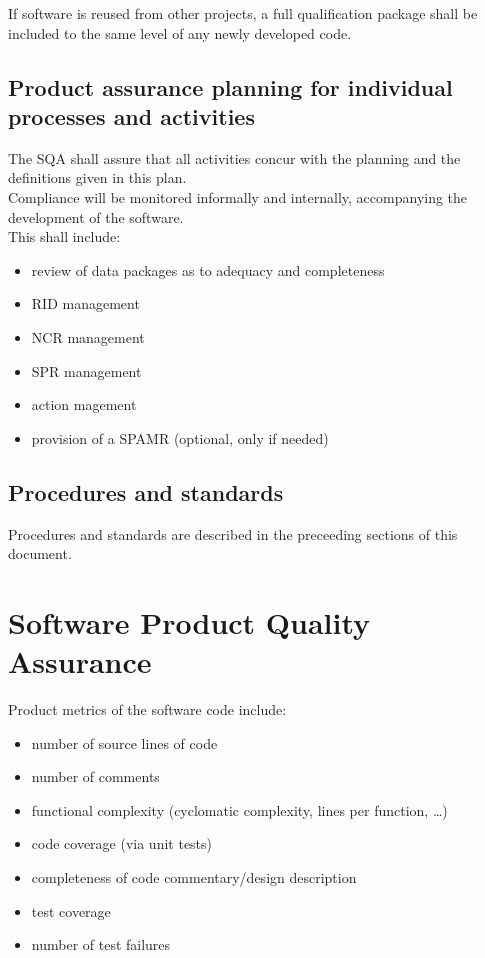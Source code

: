 If software is reused from other projects, a full qualification package shall
be included to the same level of any newly developed code.



\section{Product assurance planning for individual processes and activities}

The \gls{SQA} shall assure that all activities concur with the planning and the
definitions given in this plan.\\

\noindent
Compliance will be monitored informally and internally, accompanying the
development of the software.\\

\noindent
This shall include:

\begin{itemize}
	\item review of data packages as to adequacy and completeness
	\item \gls{RID} management
	\item \gls{NCR} management
	\item \gls{SPR} management
	\item action magement
	\item provision of a \gls{SPAMR} (optional, only if needed)
\end{itemize}


\section{Procedures and standards}

Procedures and standards are described in the preceeding sections of this
document.




\chapter{Software Product Quality Assurance}


Product metrics of the software code include:

\begin{itemize}
	\item number of source lines of code
	\item number of comments
	\item functional complexity (cyclomatic complexity, lines per function, \ldots)
	\item code coverage (via unit tests)
	\item completeness of code commentary/design description
	\item test coverage
	\item number of test failures
\end{itemize}

